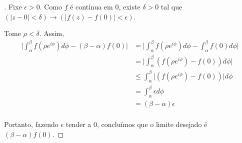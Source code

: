 
\begin{proof}[]

Fixe $\epsilon>0$.
Como $f$ é contínua em $0$, existe $\delta>0$ tal que $(\lvert z-0 \rvert < \delta)\rightarrow(\lvert f(z)-f(0)\rvert<\epsilon)$.

Tome $\rho<\delta$.
Assim,
\begin{align*}
\lvert \int_{\alpha}^{\beta}f(\rho e^{i\phi})d\phi -(\beta-\alpha)f(0)\rvert &= \lvert \int_{\alpha}^{\beta}f(\rho e^{i\phi})d\phi -\int_{\alpha}^{\beta}f(0)d\phi \rvert  \\
&=\lvert \int_{\alpha}^{\beta}(f(\rho e^{i\phi})-f(0))d\phi\rvert \\
&\leq \int_{\alpha}^{\beta}\lvert (f(\rho e^{i\phi})-f(0))\rvert d\phi \\
&=\int_{\alpha}^{\beta}\epsilon d\phi \\
&=(\beta -\alpha)\epsilon \\
\end{align*}

Portanto, fazendo $\epsilon$ tender a $0$, concluímos que o limite desejado é $(\beta - \alpha)f(0)$.

\end{proof}


